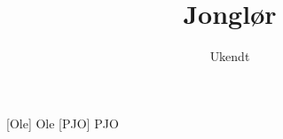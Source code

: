 \documentclass[a4paper,11pt]{article}
\title{Jonglør}
\author{Ukendt}
\begin{document}
\maketitle

\begin{roles}
[Ole] Ole
[PJO] PJO
\end{roles}

\begin{sketch}

\end{sketch}
\end{document}
